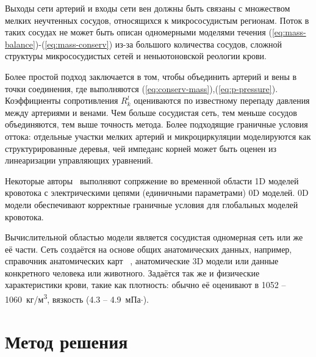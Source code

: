 Выходы сети артерий и входы сети вен должны быть связаны с множеством мелких неучтенных сосудов, относящихся к микрососудистым регионам.
Поток в таких сосудах не может быть описан одномерными моделями течения (\ref{eq:mass-balance})-(\ref{eq:mass-conserv})
из-за большого количества сосудов, сложной структуры микрососудистых сетей и неньютоновской реологии крови.

Более простой подход заключается в том, чтобы объединить артерий и вены в точки соединения,
где выполняются (\ref{eq:conserv-mass}),(\ref{eq:p-pressure}). Коэффициенты сопротивления $ R^l_k$ оцениваются  по известному перепаду
давления между артериями и венами. Чем больше сосудистая сеть, тем меньше сосудов объединяются, тем выше точность метода.
Более подходящие граничные условия оттока: отдельные участки мелких артерий и микроциркуляции моделируются как структурированные деревья,
чей импеданс корней может быть оценен из линеаризации управляющих уравнений.

Некоторые авторы~\cite{alastruey:2008} выполняют сопряжение во временной области 1D моделей кровотока с электрическими цепями
(единичными параметрами) 0D моделей. 0D модели обеспечивают корректные граничные условия для глобальных моделей кровотока.


Вычислительной областью модели является сосудистая одномерная сеть или же её части. Сеть создаётся на основе общих анатомических данных,
например, справочник анатомических карт ~\cite{bunicheva:2013}, анатомические 3D модели или данные конкретного человека или животного. 
Задаётся так же и физические характеристики крови, такие как плотность: обычно её оценивают в 1052 -- 1060~кг/м\textsuperscript{3},
вязкость (4.3 -- 4.9~мПа$\cdot$). 



\section{Метод решения}
